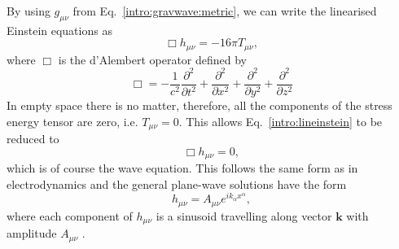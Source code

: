 By using $g_{\mu \nu}$ from Eq.~\ref{intro:gravwave:metric}, we can write the
linearised Einstein equations as
\begin{equation}
\label{intro:lineinstein}
    \Box h_{\mu \nu} = -16 \pi T_{\mu\nu},
\end{equation}
where $\Box$ is the d'Alembert operator defined by
\begin{equation}
		\Box = -\frac{1}{c^2} \frac{\partial^2}{\partial t^2} + \frac{\partial^2}{\partial x^2} + \frac{\partial^2}{\partial y^2} + \frac{\partial^2}{\partial z^2}
\end{equation}
In empty space there is no matter, therefore, all the components of the stress
energy tensor are zero, i.e. $T_{\mu \nu} = 0$.  This allows
Eq.~\ref{intro:lineinstein} to be reduced to
\begin{equation}
    \Box h_{\mu \nu} = 0,
\end{equation}
which is of course the wave equation.  This follows the same form as in
electrodynamics and the general plane-wave solutions have the form
\begin{equation}
    h_{\mu\nu} = A_{\mu\nu}e^{ik_{\alpha} x^{\alpha}},
\end{equation}
where each component of $h_{\mu \nu}$ is a sinusoid travelling along vector
$\mathbf{k}$ with amplitude $A_{\mu\nu}$
\citep{capano2011SearchingGravitational}. 

